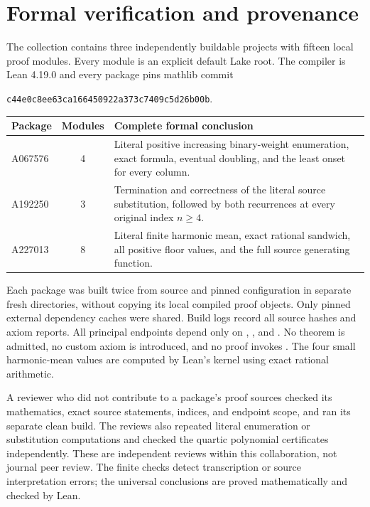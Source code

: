 \documentclass[11pt]{article}
\begin{document}
\clearpage
\section{Formal verification and provenance}

The collection contains three independently buildable projects with fifteen
local proof modules. Every module is an explicit default Lake root. The
compiler is Lean 4.19.0 and every package pins mathlib commit
\begin{center}
\texttt{c44e0c8ee63ca166450922a373c7409c5d26b00b}.
\end{center}

\begin{center}
\begin{tabular}{@{}lcp{3.8in}@{}}
\toprule
Package & Modules & Complete formal conclusion\\
\midrule
A067576 & 4 & Literal positive increasing binary-weight enumeration, exact formula, eventual doubling, and the least onset for every column.\\
A192250 & 3 & Termination and correctness of the literal source substitution, followed by both recurrences at every original index $n\ge4$.\\
A227013 & 8 & Literal finite harmonic mean, exact rational sandwich, all positive floor values, and the full source generating function.\\
\bottomrule
\end{tabular}
\end{center}

Each package was built twice from source and pinned configuration in separate
fresh directories, without copying its local compiled proof objects.
Only pinned external dependency caches were shared. Build logs record all
source hashes and axiom reports. All principal endpoints depend only on
, , and . No theorem
is admitted, no custom axiom is introduced, and no proof invokes
. The four small harmonic-mean values are computed
by Lean's kernel using exact rational arithmetic.

A reviewer who did not contribute to a package's proof sources checked its
mathematics, exact source statements, indices, and endpoint scope, and ran
its separate clean build. The reviews also repeated literal enumeration or
substitution computations and checked the quartic polynomial certificates
independently. These are independent reviews within this collaboration,
not journal peer review. The finite checks detect transcription or source
interpretation errors; the universal conclusions are proved mathematically
and checked by Lean.
\end{document}
